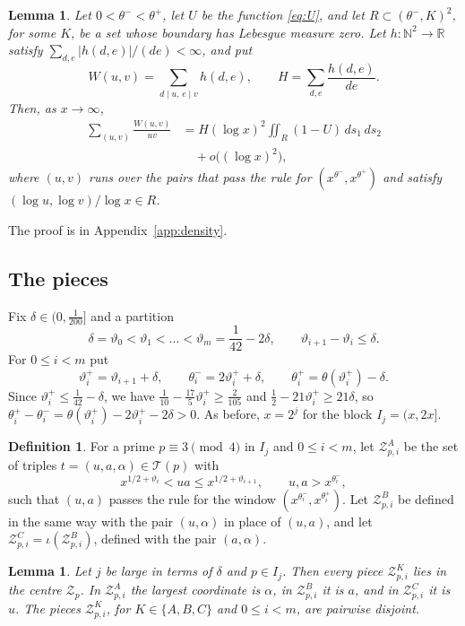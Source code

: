 \documentclass[aps,prd,twocolumn,superscriptaddress,nofootinbib,longbibliography,floatfix,showkeys,nobalancelastpage,amsmath,amssymb,10pt]{revtex4-2}
\theoremstyle{plain}
\newtheorem{lemma}[theorem]{Lemma}
\theoremstyle{definition}
\newtheorem{definition}[theorem]{Definition}
\theoremstyle{plain}
\newcommand{\NN}{\mathbb{N}}
\newcommand{\Tp}{\mathcal{T}}
\newcommand{\Zc}{\mathcal{Z}}
\begin{document}
\begin{lemma}\label{lem:density}
Let $0<\theta^-<\theta^+$, let $U$ be the function \eqref{eq:U}, and let $R\subset(\theta^-,K)^2$, for some $K$, be a set whose boundary has Lebesgue measure zero. Let $h:\NN^2\to\mathbb R$ satisfy $\sum_{d,e}|h(d,e)|/(de)<\infty$, and put
\[
W(u,v)=\sum_{d\mid u,\,e\mid v}h(d,e),\qquad H=\sum_{d,e}\frac{h(d,e)}{de}.
\]
Then, as $x\to\infty$,
\begin{align*}
\sum_{(u,v)}\frac{W(u,v)}{uv}&=H(\log x)^2\iint_R(1-U)\,ds_1\,ds_2\\
&\quad+o\bigl((\log x)^2\bigr),
\end{align*}
where $(u,v)$ runs over the pairs that pass the rule for $(x^{\theta^-},x^{\theta^+})$ and satisfy $(\log u,\log v)/\log x\in R$.
\end{lemma}

The proof is in Appendix~\ref{app:density}.

\subsection{The pieces}

Fix $\delta\in(0,\frac1{200}]$ and a partition
\[
\delta=\vartheta_0<\vartheta_1<\dots<\vartheta_m=\frac1{42}-2\delta,\qquad\vartheta_{i+1}-\vartheta_i\le\delta.
\]
For $0\le i<m$ put
\[
\vartheta_i^+=\vartheta_{i+1}+\delta,\qquad\theta_i^-=2\vartheta_i^++\delta,\qquad\theta_i^+=\theta(\vartheta_i^+)-\delta.
\]
Since $\vartheta_i^+\le\frac1{42}-\delta$, we have $\frac1{10}-\frac{17}5\vartheta_i^+\ge\frac2{105}$ and $\frac12-21\vartheta_i^+\ge21\delta$, so $\theta_i^+-\theta_i^-=\theta(\vartheta_i^+)-2\vartheta_i^+-2\delta>0$. As before, $x=2^j$ for the block $I_j=(x,2x]$.

\begin{definition}\label{def:pieces}
For a prime $p\equiv3\pmod4$ in $I_j$ and $0\le i<m$, let $\Zc^A_{p,i}$ be the set of triples $t=(u,a,\alpha)\in\Tp(p)$ with
\[
x^{1/2+\vartheta_i}<ua\le x^{1/2+\vartheta_{i+1}},\qquad u,a>x^{\theta_i^-},
\]
such that $(u,a)$ passes the rule for the window $(x^{\theta_i^-},x^{\theta_i^+})$. Let $\Zc^B_{p,i}$ be defined in the same way with the pair $(u,\alpha)$ in place of $(u,a)$, and let $\Zc^C_{p,i}=\iota(\Zc^B_{p,i})$, defined with the pair $(a,\alpha)$.
\end{definition}

\begin{lemma}\label{lem:pieces}
Let $j$ be large in terms of $\delta$ and $p\in I_j$. Then every piece $\Zc^K_{p,i}$ lies in the centre $\Zc_p$. In $\Zc^A_{p,i}$ the largest coordinate is $\alpha$, in $\Zc^B_{p,i}$ it is $a$, and in $\Zc^C_{p,i}$ it is $u$. The pieces $\Zc^K_{p,i}$, for $K\in\{A,B,C\}$ and $0\le i<m$, are pairwise disjoint.
\end{lemma}
\end{document}
